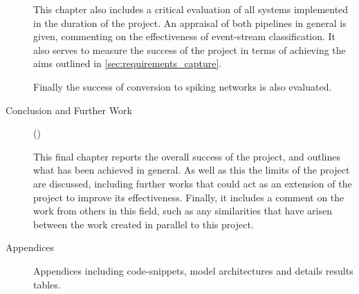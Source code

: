 \begin{description}
      This chapter also includes a critical evaluation of all systems implemented in the duration of the project. An appraisal of both pipelines in general is given, commenting on the effectiveness of event-stream classification. It also serves to measure the success of the project in terms of achieving the aims outlined in \cref{sec:requirements_capture}.

      Finally the success of conversion to spiking networks is also evaluated.
      
      \item[Conclusion and Further Work] ()
      
      This final chapter reports the overall success of the project, and outlines what has been achieved in general. As well as this the limits of the project are discussed, including further works that could act as an extension of the project to improve its effectiveness. Finally, it includes a comment on the work from others in this field, such as any similarities that have arisen between the work created in parallel to this project.
      
      \item[Appendices]
      Appendices including code-snippets, model architectures and details results tables.
\end{description}